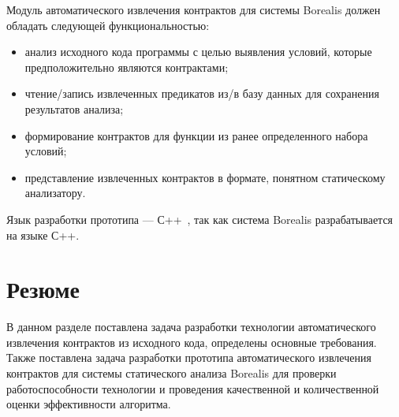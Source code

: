 Модуль автоматического извлечения контрактов для системы Borealis должен обладать следующей функциональностью:
\begin{itemize}
\item анализ исходного кода программы с целью выявления условий, которые предположительно являются контрактами;
\item чтение/запись извлеченных предикатов из/в базу данных для сохранения результатов анализа;
\item формирование контрактов для функции из ранее определенного набора условий;
\item представление извлеченных контрактов в формате, понятном статическому анализатору.
\end{itemize}
Язык разработки прототипа --- С++~\cite{languageC++}, так как система Borealis разрабатывается на языке С++.

\section{Резюме}
В данном разделе поставлена задача разработки технологии автоматического извлечения контрактов из исходного кода, определены основные требования. Также поставлена задача разработки прототипа автоматического извлечения контрактов для системы статического анализа Borealis для проверки работоспособности технологии и проведения качественной и количественной оценки эффективности алгоритма. 